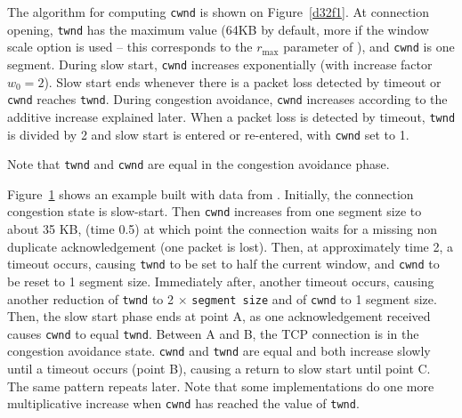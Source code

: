 The algorithm for computing \texttt{cwnd} is shown on
Figure~\ref{d32f1}.  At connection opening, \texttt{twnd} has the
maximum value (64KB by default, more if the window scale option is
used -- this corresponds to the $r_{\max}$ parameter of
), and \texttt{cwnd} is one segment.  During slow
start, \texttt{cwnd} increases exponentially (with increase factor
$w_0=2$). Slow start ends whenever there is a packet loss detected
by timeout or \texttt{cwnd} reaches \texttt{twnd}.  During
congestion avoidance, \texttt{cwnd} increases according to the
additive increase explained later.  When a packet loss is detected
by timeout, \texttt{twnd} is divided by 2 and slow start is entered
or re-entered, with \texttt{cwnd} set to 1.

Note that \texttt{twnd} and \texttt{cwnd} are equal in the congestion
avoidance phase.

Figure~\ref{d32f2} shows an example built with data from \cite{BP95}.
Initially, the connection congestion state is slow-start.  Then
\texttt{cwnd} increases from one segment size to about 35 KB, (time
0.5) at which point the connection waits for a missing non duplicate
acknowledgement (one packet is lost).  Then, at approximately time 2,
a timeout occurs, causing \texttt{twnd} to be set to half the current
window, and \texttt{cwnd} to be reset to 1 segment size.  Immediately
after, another timeout occurs, causing another reduction of
\texttt{twnd} to 2 $\times$ \texttt{segment size} and of \texttt{cwnd}
to 1 segment size.  Then, the slow start phase ends at point A, as one
acknowledgement received causes \texttt{cwnd} to equal \texttt{twnd}.
Between A and B, the TCP connection is in the congestion avoidance
state.  \texttt{cwnd} and \texttt{twnd} are equal and both increase
slowly until a timeout occurs (point B), causing a return to slow
start until point C. The same pattern repeats later.  Note that some
implementations do one more multiplicative increase when \texttt{cwnd}
has reached the value of \texttt{twnd}.

\begin{figure}[h]
        \protect\label{d32f2}
\end{figure}

